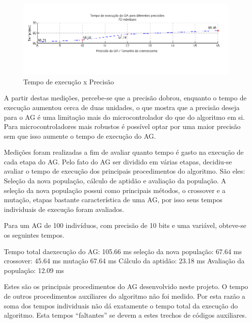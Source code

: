 \documentclass[
    12pt,               %
    oneside,%
    a4paper,            %
    english,            %
    french,             %
    spanish,            %
    brazil,             %
    ]{abntex2}
\begin{document}
  	\begin{figure}[tb]
	\centering 
	\includegraphics[width=1.0\columnwidth]{images/precisao_x_tempo} 
	\caption[Tempo de execução x Precisão]{Tempo de execução x Precisão}
	\label{fig:tempo_precisao} 
	\end{figure}

  A partir destas medições, percebe-se que a precisão dobrou, enquanto o tempo de execução aumentou cerca de duas unidades, o que mostra que a precisão deseja para o AG é uma limitação mais do microcontrolador do que do algoritmo em si. Para microcontroladores mais robustos é possível optar por uma maior precisão sem que isso aumente o tempo de execução do AG.

  Medições foram realizadas a fim de avaliar quanto tempo é gasto na execução de cada etapa do AG. Pelo fato do AG ser  dividido em várias etapas, decidiu-se avaliar o tempo de execução dos principais procedimentos do algoritmo. São eles: Seleção da nova população, cálculo de aptidão e avaliação da população. A seleção da nova população possui como principais métodos, o crossover e a mutação, etapas bastante característica de uma AG, por isso seus tempos individuais de execução foram avaliados.

  Para um AG de 100 indivíduos, com precisão de 10 bits e uma variável, obteve-se os seguintes tempos.

 Tempo total daexecução do AG:  105.66 ms
 seleção da nova população: 67.64 ms
	crossover: 45.64 ms
	mutação 67.64 ms
 Cálculo da aptidão: 23.18 ms
 Avaliação da população: 12.09 ms

 Estes são os principais procedimentos do AG desenvolvido neste projeto. O tempo de outros procedimentos auxiliares do algoritmo não foi medido. Por esta razão a soma dos tempos individuais não dá exatamente o tempo total da execução do algoritmo. Esta tempos “faltantes” se devem a estes trechos de códigos auxiliares.




\end{document}
